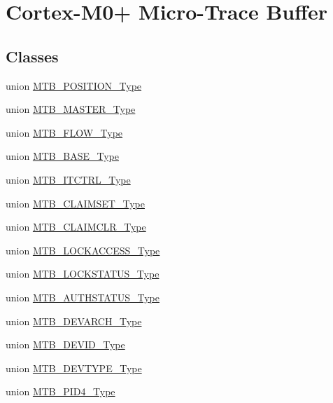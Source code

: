 \hypertarget{group___s_a_m_l21___m_t_b}{}\section{Cortex-\/\+M0+ Micro-\/\+Trace Buffer}
\label{group___s_a_m_l21___m_t_b}
\subsection*{Classes}
\begin{DoxyCompactItemize}
\item 
union \hyperlink{union_m_t_b___p_o_s_i_t_i_o_n___type}{M\+T\+B\+\_\+\+P\+O\+S\+I\+T\+I\+O\+N\+\_\+\+Type}
\item 
union \hyperlink{union_m_t_b___m_a_s_t_e_r___type}{M\+T\+B\+\_\+\+M\+A\+S\+T\+E\+R\+\_\+\+Type}
\item 
union \hyperlink{union_m_t_b___f_l_o_w___type}{M\+T\+B\+\_\+\+F\+L\+O\+W\+\_\+\+Type}
\item 
union \hyperlink{union_m_t_b___b_a_s_e___type}{M\+T\+B\+\_\+\+B\+A\+S\+E\+\_\+\+Type}
\item 
union \hyperlink{union_m_t_b___i_t_c_t_r_l___type}{M\+T\+B\+\_\+\+I\+T\+C\+T\+R\+L\+\_\+\+Type}
\item 
union \hyperlink{union_m_t_b___c_l_a_i_m_s_e_t___type}{M\+T\+B\+\_\+\+C\+L\+A\+I\+M\+S\+E\+T\+\_\+\+Type}
\item 
union \hyperlink{union_m_t_b___c_l_a_i_m_c_l_r___type}{M\+T\+B\+\_\+\+C\+L\+A\+I\+M\+C\+L\+R\+\_\+\+Type}
\item 
union \hyperlink{union_m_t_b___l_o_c_k_a_c_c_e_s_s___type}{M\+T\+B\+\_\+\+L\+O\+C\+K\+A\+C\+C\+E\+S\+S\+\_\+\+Type}
\item 
union \hyperlink{union_m_t_b___l_o_c_k_s_t_a_t_u_s___type}{M\+T\+B\+\_\+\+L\+O\+C\+K\+S\+T\+A\+T\+U\+S\+\_\+\+Type}
\item 
union \hyperlink{union_m_t_b___a_u_t_h_s_t_a_t_u_s___type}{M\+T\+B\+\_\+\+A\+U\+T\+H\+S\+T\+A\+T\+U\+S\+\_\+\+Type}
\item 
union \hyperlink{union_m_t_b___d_e_v_a_r_c_h___type}{M\+T\+B\+\_\+\+D\+E\+V\+A\+R\+C\+H\+\_\+\+Type}
\item 
union \hyperlink{union_m_t_b___d_e_v_i_d___type}{M\+T\+B\+\_\+\+D\+E\+V\+I\+D\+\_\+\+Type}
\item 
union \hyperlink{union_m_t_b___d_e_v_t_y_p_e___type}{M\+T\+B\+\_\+\+D\+E\+V\+T\+Y\+P\+E\+\_\+\+Type}
\item 
union \hyperlink{union_m_t_b___p_i_d4___type}{M\+T\+B\+\_\+\+P\+I\+D4\+\_\+\+Type}

\end{DoxyCompactItemize}
